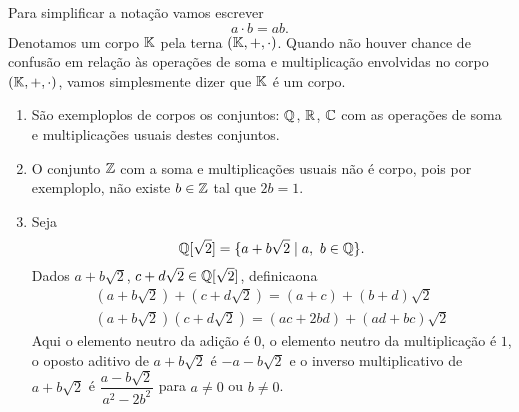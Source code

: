 Para simplificar a nota\c{c}\~ao vamos escrever
\[
  a \cdot b = ab.
\]
Denotamos um corpo $\mathbb{K}$ pela terna $(\mathbb{K}, +, \cdot)$. Quando n\~ao houver chance de confus\~ao em rela\c{c}\~ao \`as opera\c{c}\~oes de soma e multiplica\c{c}\~ao envolvidas no corpo $(\mathbb{K}, +, \cdot)$, vamos simplesmente dizer que $\mathbb{K}$ \'e um corpo.

\begin{exemplo}
	\begin{enumerate}
		\item S\~ao exemploplos de corpos os conjuntos: $\mathbb{Q}$, $\mathbb{R}$, $\mathbb{C}$ com as opera\c{c}\~oes de soma e multiplica\c{c}\~oes usuais destes conjuntos.
		\item O conjunto $\mathbb{Z}$ com a soma e multiplica\c{c}\~oes usuais n\~ao \'e corpo, pois por exemploplo, n\~ao existe $b \in \mathbb{Z}$ tal que $2b = 1$.
		\item Seja
			\[
			  \mathbb{Q}{[\sqrt{2}]} = \{a + b\sqrt{2} \mid a,\ b \in \mathbb{Q}\}.
			\]
			Dados $a + b\sqrt{2}$, $c + d\sqrt{2} \in \mathbb{Q}{[\sqrt{2}]}$, definicaona
			\begin{align*}
				(a + b\sqrt{2}) + (c + d\sqrt{2}) = (a + c) + (b + d)\sqrt{2}\\
				(a + b\sqrt{2})(c + d\sqrt{2}) = (ac + 2bd) + (ad + bc)\sqrt{2}
			\end{align*}
			Aqui o elemento neutro da adi\c{c}\~ao \'e $0$, o elemento neutro da multiplica\c{c}\~ao \'e $1$, o oposto aditivo de $a + b\sqrt{2}$ \'e $-a - b\sqrt{2}$ e o inverso multiplicativo de $a + b\sqrt{2}$ \'e $\dfrac{a - b\sqrt{2}}{a^2 - 2b^2}$ para $a \ne 0$ ou $b \ne 0$.

	\end{enumerate}
\end{exemplo}

